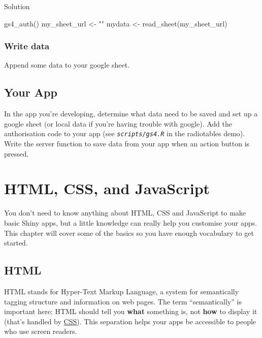\documentclass[
  oneside]{book}
\newenvironment{Shaded}{\begin{snugshade}}{\end{snugshade}}
\newcommand{\FunctionTok}[1]{\textcolor[rgb]{0.00,0.00,0.00}{#1}}
\newcommand{\NormalTok}[1]{#1}
\newcommand{\OtherTok}[1]{\textcolor[rgb]{0.56,0.35,0.01}{#1}}
\newcommand{\StringTok}[1]{\textcolor[rgb]{0.31,0.60,0.02}{#1}}
\begin{document}
Solution

\begin{Shaded}
\begin{Highlighting}[]
\FunctionTok{gs4\_auth}\NormalTok{()}
\NormalTok{my\_sheet\_url }\OtherTok{\textless{}{-}} \StringTok{""}
\NormalTok{mydata }\OtherTok{\textless{}{-}} \FunctionTok{read\_sheet}\NormalTok{(my\_sheet\_url)}
\end{Highlighting}
\end{Shaded}

\hypertarget{write-data}{%
\subsection{Write data}\label{write-data}}

Append some data to your google sheet.

\hypertarget{your-app-data}{%
\section{Your App}\label{your-app-data}}

In the app you're developing, determine what data need to be saved and set up a google sheet (or local data if you're having trouble with google). Add the authorisation code to your app (see \textit{\texttt{scripts/gs4.R}} in the radiotables demo). Write the server function to save data from your app when an action button is pressed.

\hypertarget{web}{%
\chapter{HTML, CSS, and JavaScript}\label{web}}

You don't need to know anything about HTML, CSS and JavaScript to make basic Shiny apps, but a little knowledge can really help you customise your apps. This chapter will cover some of the basics so you have enough vocabulary to get started.

\hypertarget{html}{%
\section{HTML}\label{html}}

HTML stands for Hyper-Text Markup Language, a system for semantically tagging structure and information on web pages. The term ``semantically'' is important here; HTML should tell you \textbf{what} something is, not \textbf{how} to display it (that's handled by \protect\hyperlink{CSS}{CSS}). This separation helps your apps be accessible to people who use screen readers.
\end{document}
